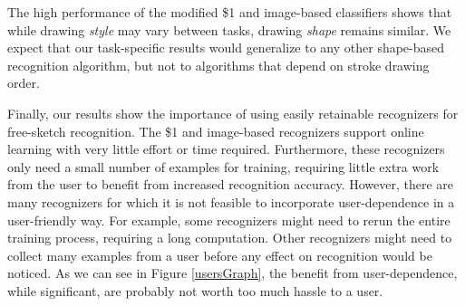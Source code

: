 \documentclass{egpubl}
\begin{document}
The high performance of the modified \$1 and image-based classifiers
shows that while drawing \textit{style} may vary between tasks, drawing \textit{shape} remains similar.  We expect that our task-specific results would generalize to any other shape-based recognition algorithm, but not to algorithms that depend on stroke drawing order.




Finally, our results show the importance of using easily retainable recognizers for free-sketch recognition.  The \$1 and image-based recognizers support online learning with very little effort or time required. Furthermore, these recognizers only need a small number of examples for training, requiring little extra work from the user to benefit from increased recognition accuracy. However, there are many recognizers for which it is not feasible to incorporate user-dependence in a user-friendly way. For example, some recognizers might need to rerun the entire training process, requiring a long computation. Other recognizers might need to collect many examples from a user before any effect on recognition would be noticed. As we can see in Figure \ref{usersGraph}, the benefit from user-dependence, while significant, are probably not worth too much hassle to a user.
\end{document}
